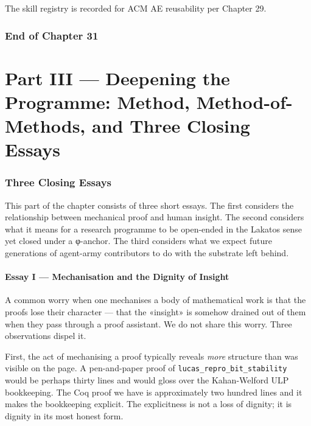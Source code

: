 The skill registry is recorded for ACM AE reusability per Chapter 29.

\section*{End of Chapter 31}
\label{sec:31-end}


\part*{Part III — Deepening the Programme: Method, Method-of-Methods, and Three Closing Essays}

\section{Three Closing Essays}
\label{sec:31-closing-essays}

This part of the chapter consists of three short essays. The first considers the relationship between mechanical proof and human insight. The second considers what it means for a research programme to be open-ended in the Lakatos sense yet closed under a φ-anchor. The third considers what we expect future generations of agent-army contributors to do with the substrate left behind.

\subsection{Essay I — Mechanisation and the Dignity of Insight}
\label{sec:31-essay-1}

A common worry when one mechanises a body of mathematical work is that the proofs lose their character — that the «insight» is somehow drained out of them when they pass through a proof assistant. We do not share this worry. Three observations dispel it.

First, the act of mechanising a proof typically reveals \emph{more} structure than was visible on the page. A pen-and-paper proof of \texttt{lucas\_repro\_bit\_stability} would be perhaps thirty lines and would gloss over the Kahan-Welford ULP bookkeeping. The Coq proof we have is approximately two hundred lines and it makes the bookkeeping explicit. The explicitness is not a loss of dignity; it is dignity in its most honest form.


